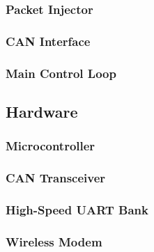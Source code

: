 \subsubsection{Packet Injector}


\subsubsection{CAN Interface}


\subsubsection{Main Control Loop}


\subsection{Hardware}


\subsubsection{Microcontroller}


\subsubsection{CAN Transceiver}


\subsubsection{High-Speed UART Bank}


\subsubsection{Wireless Modem}